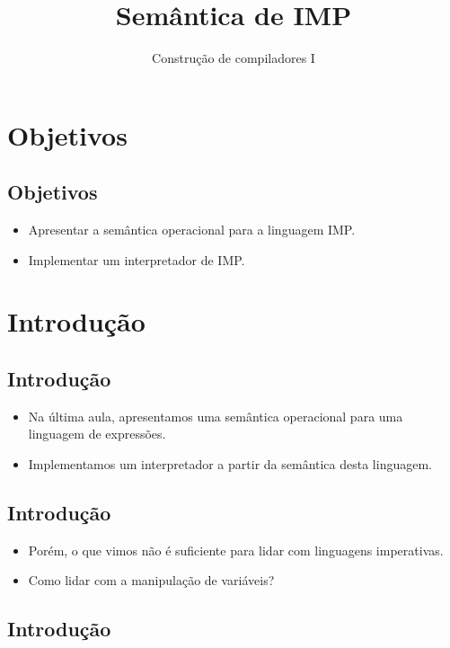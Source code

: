 \documentclass[11pt]{article}
\author{Construção de compiladores I}
\date{}
\title{Semântica de IMP}
\begin{document}
\maketitle
\section*{Objetivos}
\label{sec:org05319c8}

\subsection*{Objetivos}
\label{sec:orgaf7b2c4}

\begin{itemize}
\item Apresentar a semântica operacional para a linguagem IMP.

\item Implementar um interpretador de IMP.
\end{itemize}
\section*{Introdução}
\label{sec:orgd5ca1f4}

\subsection*{Introdução}
\label{sec:org5d4e26a}

\begin{itemize}
\item Na última aula, apresentamos uma semântica operacional para uma linguagem de expressões.

\item Implementamos um interpretador a partir da semântica desta linguagem.
\end{itemize}
\subsection*{Introdução}
\label{sec:org831e662}

\begin{itemize}
\item Porém, o que vimos não é suficiente para lidar com linguagens imperativas.

\item Como lidar com a manipulação de variáveis?
\end{itemize}
\subsection*{Introdução}
\label{sec:org23b1ac9}
\end{document}
